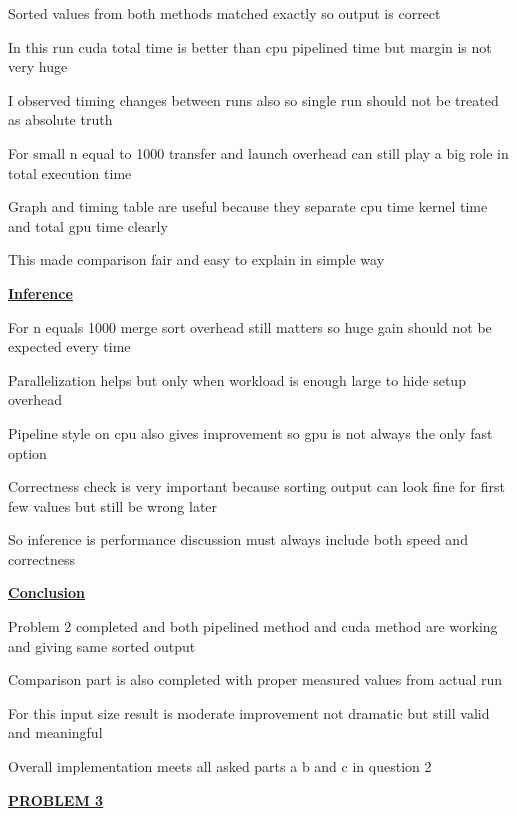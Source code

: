 \documentclass[12pt]{article}
\begin{document}
Sorted values from both methods matched exactly so output is correct

In this run cuda total time is better than cpu pipelined time but margin is not very huge

I observed timing changes between runs also so single run should not be treated as absolute truth

For small n equal to 1000 transfer and launch overhead can still play a big role in total execution time

Graph and timing table are useful because they separate cpu time kernel time and total gpu time clearly

This made comparison fair and easy to explain in simple way

\vspace{0.8cm}

\textbf{\Large \underline{Inference}}

\vspace{0.5cm}

For n equals 1000 merge sort overhead still matters so huge gain should not be expected every time

Parallelization helps but only when workload is enough large to hide setup overhead

Pipeline style on cpu also gives improvement so gpu is not always the only fast option

Correctness check is very important because sorting output can look fine for first few values but still be wrong later

So inference is performance discussion must always include both speed and correctness

\vspace{0.8cm}

\textbf{\Large \underline{Conclusion}}

\vspace{0.5cm}

Problem 2 completed and both pipelined method and cuda method are working and giving same sorted output

Comparison part is also completed with proper measured values from actual run

For this input size result is moderate improvement not dramatic but still valid and meaningful

Overall implementation meets all asked parts a b and c in question 2

\newpage

\noindent
{\Huge\underline{\textbf{PROBLEM 3}}}
\end{document}
